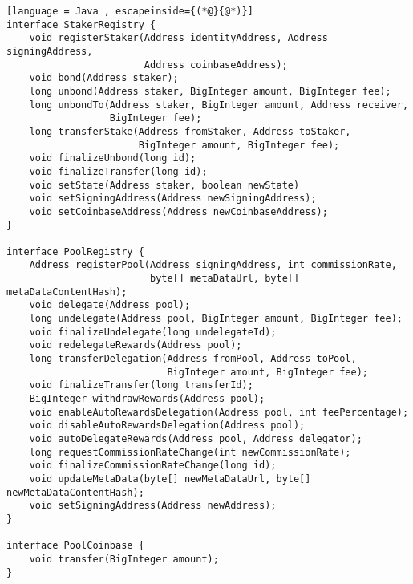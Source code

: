 \begin{lstlisting}[language = Java , escapeinside={(*@}{@*)}]
interface StakerRegistry {
    void registerStaker(Address identityAddress, Address signingAddress,
                        Address coinbaseAddress);
    void bond(Address staker);
    long unbond(Address staker, BigInteger amount, BigInteger fee);
    long unbondTo(Address staker, BigInteger amount, Address receiver, 
                  BigInteger fee);
    long transferStake(Address fromStaker, Address toStaker, 
                       BigInteger amount, BigInteger fee);
    void finalizeUnbond(long id);
    void finalizeTransfer(long id);
    void setState(Address staker, boolean newState)
    void setSigningAddress(Address newSigningAddress);
    void setCoinbaseAddress(Address newCoinbaseAddress);
}

interface PoolRegistry {
    Address registerPool(Address signingAddress, int commissionRate, 
                         byte[] metaDataUrl, byte[] metaDataContentHash);
    void delegate(Address pool);
    long undelegate(Address pool, BigInteger amount, BigInteger fee);
    void finalizeUndelegate(long undelegateId);
    void redelegateRewards(Address pool);
    long transferDelegation(Address fromPool, Address toPool, 
                            BigInteger amount, BigInteger fee);
    void finalizeTransfer(long transferId);
    BigInteger withdrawRewards(Address pool);
    void enableAutoRewardsDelegation(Address pool, int feePercentage);
    void disableAutoRewardsDelegation(Address pool);
    void autoDelegateRewards(Address pool, Address delegator);
    long requestCommissionRateChange(int newCommissionRate);
    void finalizeCommissionRateChange(long id);
    void updateMetaData(byte[] newMetaDataUrl, byte[] newMetaDataContentHash);
    void setSigningAddress(Address newAddress);
}

interface PoolCoinbase { 
    void transfer(BigInteger amount); 
}

\end{lstlisting}
\clearpage
